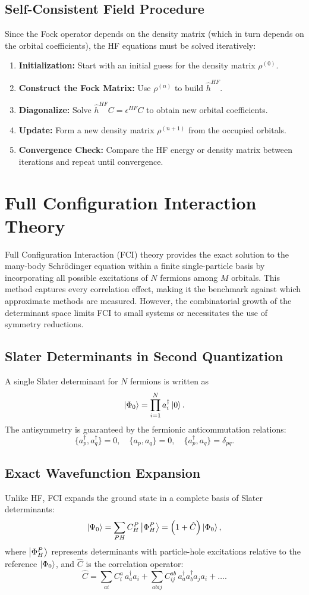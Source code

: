 \subsection{Self-Consistent Field Procedure}
Since the Fock operator depends on the density matrix (which in turn depends on the orbital coefficients), the HF equations must be solved iteratively:
\begin{enumerate}
    \item \textbf{Initialization:} Start with an initial guess for the density matrix $\rho^{(0)}$.
    \item \textbf{Construct the Fock Matrix:} Use $\rho^{(n)}$ to build $\hat{h}^{HF}$.
    \item \textbf{Diagonalize:} Solve $\hat{h}^{HF} C = \epsilon^{HF} C$ to obtain new orbital coefficients.
    \item \textbf{Update:} Form a new density matrix $\rho^{(n+1)}$ from the occupied orbitals.
    \item \textbf{Convergence Check:} Compare the HF energy or density matrix between iterations and repeat until convergence.
\end{enumerate}


\section{Full Configuration Interaction Theory}

Full Configuration Interaction (FCI) theory provides the exact solution to the many-body Schrödinger equation within a finite single-particle basis by incorporating all possible excitations of $N$ fermions among $M$ orbitals. This method captures every correlation effect, making it the benchmark against which approximate methods are measured. However, the combinatorial growth of the determinant space limits FCI to small systems or necessitates the use of symmetry reductions.

\subsection{Slater Determinants in Second Quantization}
A single Slater determinant for $N$ fermions is written as
\[
\ket{\Phi_0} = \prod_{i=1}^N a_i^\dagger \ket{0}.
\]
The antisymmetry is guaranteed by the fermionic anticommutation relations:
\[
\{a_p^\dagger, a_q^\dagger\} = 0, \quad \{a_p, a_q\} = 0, \quad \{a_p^\dagger, a_q\} = \delta_{pq}.
\]

\subsection{Exact Wavefunction Expansion}
Unlike HF, FCI expands the ground state in a complete basis of Slater determinants:
\[
\ket{\Psi_0} = \sum_{PH} C_H^P \ket{\Phi_H^P} = \Bigl(1 + \hat{C}\Bigr) \ket{\Phi_0},
\]
where $\ket{\Phi_H^P}$ represents determinants with particle-hole excitations relative to the reference $\ket{\Phi_0}$, and $\hat{C}$ is the correlation operator:
\[
\hat{C} = \sum_{ai} C_i^a\, a_a^\dagger a_i + \sum_{abij} C_{ij}^{ab}\, a_a^\dagger a_b^\dagger a_j a_i + \dots.
\]

